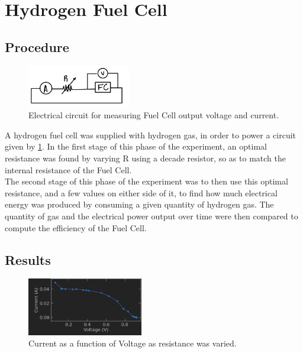 \documentclass[aps,prl,reprint]{revtex4-2}
\begin{document}
\section{Hydrogen Fuel Cell}

\subsection{Procedure}

\begin{figure}[h]
\includegraphics[width=0.4\textwidth]{../Images/l1_PartD.jpg}
\caption{\label{figD}Electrical circuit for measuring Fuel Cell output voltage and current.}
\end{figure}

A hydrogen fuel cell was supplied with hydrogen gas, in order to power a circuit
given by \ref{figD}. In the first stage of this phase of the experiment, an 
optimal resistance was found by varying R using a decade resistor,
so as to match the internal resistance of the Fuel Cell. \\

The second stage of this phase of the experiment was to then use this optimal
resistance, and a few values on either side of it, to find how much electrical
energy was produced by consuming a given quantity of hydrogen gas. The
quantity of gas and the electrical power output over time were then compared to 
compute the efficiency of the Fuel Cell.

\subsection{Results}

\begin{figure}[h]
\includegraphics[width=0.45\textwidth]{../Images/l1_d_1_trial_b.png}
\caption{\label{I(V)D}Current as a function of Voltage as resistance was varied.}
\end{figure}
\end{document}
